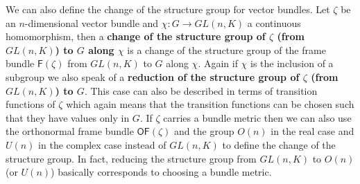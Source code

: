 We can also define the change of the structure group for vector bundles. Let $\zeta$ be an $n$-dimensional vector bundle and $\chi \colon G \to GL(n,K)$ a continuous homomorphism, then a \textbf{change of the structure group of $\zeta$ (from $GL(n,K)$) to $G$ along $\chi$} is a change of the structure group of the frame bundle $\mathsf{F}(\zeta)$ from $GL(n,K)$ to $G$ along $\chi$. Again if $\chi$ is the inclusion of a subgroup we also speak of a \textbf{reduction of the structure group of $\zeta$ (from $GL(n,K)$) to $G$}. This case can also be described in terms of transition functions of $\zeta$ which again means that the transition functions can be chosen such that they have values only in $G$. If $\zeta$ carries a bundle metric then we can also use the orthonormal frame bundle $\mathsf{OF}(\zeta)$ and the group $O(n)$ in the real case and $U(n)$ in the complex case instead of $GL(n,K)$ to define the change of the structure group. In fact, reducing the structure group from $GL(n,K)$ to $O(n)$ (or $U(n)$) basically corresponds to choosing a bundle metric.
